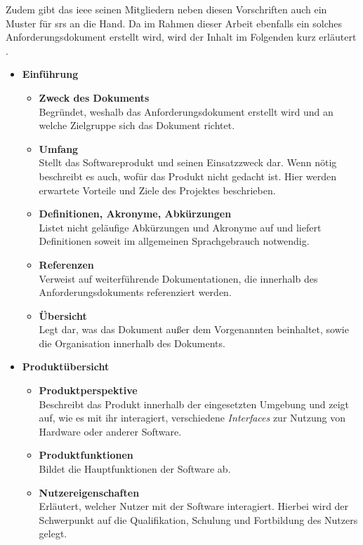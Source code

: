 Zudem gibt das \ac{ieee} seinen Mitgliedern neben diesen Vorschriften auch ein Muster für \ac{srs} an die Hand. Da im Rahmen dieser Arbeit ebenfalls ein solches Anforderungsdokument erstellt wird, wird der Inhalt im Folgenden kurz erläutert \citep[vgl.][S. 11 ff.]{ieee1998}.
\begin{itemize}
	\item \textbf{Einführung} \citep[vgl.][S. 11 - 12]{ieee1998}
	\begin{itemize}
		\item \textbf{Zweck des Dokuments} \\
		Begründet, weshalb das Anforderungsdokument erstellt wird und an welche Zielgruppe sich das Dokument richtet.
		\item \textbf{Umfang} \\
		Stellt das Softwareprodukt und seinen Einsatzzweck dar. Wenn nötig beschreibt es auch, wofür das Produkt nicht gedacht ist. Hier werden erwartete Vorteile und Ziele des Projektes beschrieben.
		\item \textbf{Definitionen, Akronyme, Abkürzungen} \\
		Listet nicht geläufige Abkürzungen und Akronyme auf und liefert Definitionen soweit im allgemeinen Sprachgebrauch notwendig.
		\item \textbf{Referenzen} \\
		Verweist auf weiterführende Dokumentationen, die innerhalb des Anforderungsdokuments referenziert werden.
		\item \textbf{Übersicht} \\
		Legt dar, was das Dokument außer dem Vorgenannten beinhaltet, sowie die Organisation innerhalb des Dokuments.
	\end{itemize}
	\item \textbf{Produktübersicht} \citep[vgl.][S. 12 - 15]{ieee1998}
	\begin{itemize}
		\item \textbf{Produktperspektive} \\
		Beschreibt das Produkt innerhalb der eingesetzten Umgebung und zeigt auf, wie es mit ihr interagiert, \zb verschiedene \textit{Interfaces} zur Nutzung von Hardware oder anderer Software.
		\item \textbf{Produktfunktionen} \\
		Bildet die Hauptfunktionen der Software ab.
		\item \textbf{Nutzereigenschaften} \\
		Erläutert, welcher Nutzer mit der Software interagiert. Hierbei wird der Schwerpunkt auf die Qualifikation, Schulung und Fortbildung des Nutzers gelegt.

\end{itemize}
\end{itemize}
